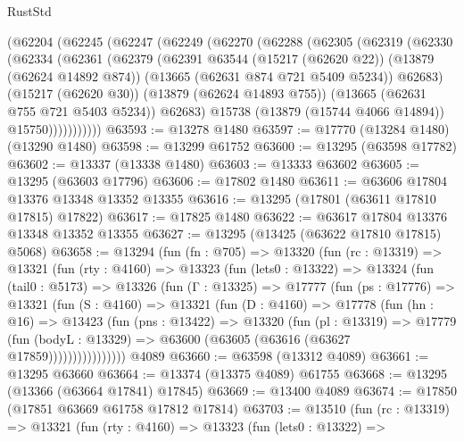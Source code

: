 \begin{lexlean}{RustStd}
\begin{coremodule}
    (@62204
      (@62245
        (@62247
          (@62249
            (@62270
              (@62288
                (@62305
                  (@62319
                    (@62330
                      (@62334
                        (@62361
                          (@62379
                            (@62391
                              @63544
                              (@15217 (@62620 @22))
                              (@13879 (@62624 @14892 @874))
                              (@13665 (@62631 @874 @721 @5409 @5234))
                              @62683)
                            (@15217 (@62620 @30))
                            (@13879 (@62624 @14893 @755))
                            (@13665 (@62631 @755 @721 @5403 @5234))
                            @62683)
                          @15738
                          (@13879 (@15744 @4066 @14894))
                          @15750)))))))))))
@63593 := @13278 @1480
@63597 := @17770 (@13284 @1480) (@13290 @1480)
@63598 := @13299 @61752
@63600 := @13295 (@63598 @17782)
@63602 := @13337 (@13338 @1480)
@63603 := @13333 @63602
@63605 := @13295 (@63603 @17796)
@63606 := @17802 @1480
@63611 := @63606 @17804 @13376 @13348 @13352 @13355
@63616 := @13295 (@17801 (@63611 @17810 @17815) @17822)
@63617 := @17825 @1480
@63622 := @63617 @17804 @13376 @13348 @13352 @13355
@63627 := @13295 (@13425 (@63622 @17810 @17815) @5068)
@63658 := @13294
    (fun (fn : @705) =>
    @13320
      (fun (rc : @13319) =>
      @13321
        (fun (rty : @4160) =>
        @13323
          (fun (lets0 : @13322) =>
          @13324
            (fun (tail0 : @5173) =>
            @13326
              (fun (Γ : @13325) =>
              @17777
                (fun (ps : @17776) =>
                @13321
                  (fun (S : @4160) =>
                  @13321
                    (fun (D : @4160) =>
                    @17778
                      (fun (hn : @16) =>
                      @13423
                        (fun (pns : @13422) =>
                        @13320
                          (fun (pl : @13319) =>
                          @17779
                            (fun (bodyL : @13329) =>
                            @63600 (@63605 (@63616 (@63627 @17859))))))))))))))))
    @4089
@63660 := @63598 (@13312 @4089)
@63661 := @13295 @63660
@63664 := @13374 (@13375 @4089) @61755
@63668 := @13295 (@13366 (@63664 @17841) @17845)
@63669 := @13400 @4089
@63674 := @17850 (@17851 @63669 @61758 @17812 @17814)
@63703 := @13510
    (fun (rc : @13319) =>
    @13321
      (fun (rty : @4160) =>
      @13323
        (fun (lets0 : @13322) =>

\end{coremodule}
\end{lexlean}
